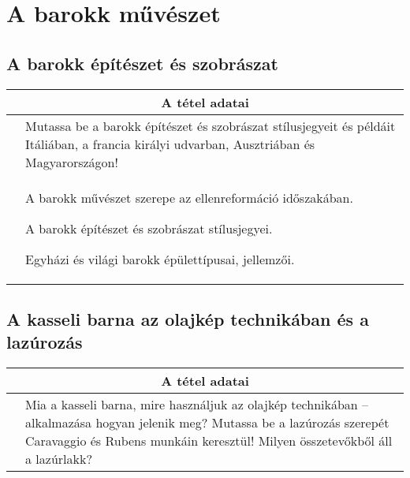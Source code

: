 \chapter{A barokk művészet} %
\label{ch:10_barokk_muveszet}

\section{A barokk építészet és szobrászat}

\begin{center}
	\begin{longtable}{ | p{} | p{} | }
		
		\hline
		\multicolumn{2}{|c|}{\textbf{A tétel adatai}}
		\\ \hline
		
		\hline
		\centering{Tétel teljes címe}
		&
		Mutassa be a barokk építészet és szobrászat stílusjegyeit és példáit Itáliában, a francia királyi udvarban, Ausztriában és Magyarországon!
		\\ \hline
		
		\centering{Jegyzetek}
		&
		\begin{compactitem}
			\item A barokk művészet szerepe az ellenreformáció időszakában.
			\item A barokk építészet és szobrászat stílusjegyei.
			\item Egyházi és világi barokk épülettípusai, jellemzői.
		\end{compactitem}
		\\\hline
		
	\end{longtable}
\end{center}

\cleardoublepage


\section{A kasseli barna az olajkép technikában és a lazúrozás}

\begin{center}
	\begin{longtable}{ | p{} | p{} | }
		
		\hline
		\multicolumn{2}{|c|}{\textbf{A tétel adatai}}
		\\ \hline
		
		\hline
		\centering{Tétel teljes címe}
		&
		Mia a kasseli barna, mire használjuk az olajkép technikában -- alkalmazása hogyan jelenik meg? Mutassa be a lazúrozás szerepét Caravaggio és Rubens munkáin keresztül! Milyen összetevőkből áll a lazúrlakk?
		\\ \hline
		
	\end{longtable}
\end{center}